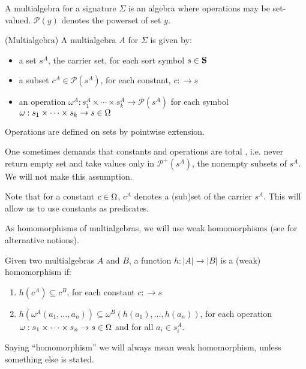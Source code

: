 \documentclass[10pt]{article}
\begin{document}
A multialgebra for a signature $\Sigma$ is an algebra where operations may be
set-valued. ${\mathcal{P}}(y)$ denotes the powerset of set $y$.

\begin{definition}\label{def:ma}
(Multialgebra) A multialgebra $A$ for $\Sigma$ is given by:
\begin{itemize}
\item  a set $s^A$, the carrier set, for each sort symbol $s\in{\bf S}$
\item  a subset $ c^A \in {\mathcal{P}}(s^A)$, for each constant, $c:\to s$
\item an operation $\omega^A : s_1^A \times \cdots \times s_k^A \to {\mathcal{P}}(s^A)$
	for each symbol $\omega : s_1\times\cdots\times s_k \to s \in \Omega$
\end{itemize}
Operations are defined on sets by pointwise extension.
\end{definition}
One sometimes demands that constants and operations are total
\cite{calc,toplas}, i.e. never return empty set and take values only in
${\mathcal{P}}^+(s^A)$, the nonempty subsets of $s^A$. We will not make this
assumption.%

Note that for a constant $c \in \Omega$, $c^A$ denotes a (sub)set of the
carrier $s^A$. This will allow us to use constants  as predicates. 

As homomorphisms of multialgebras, we will use weak homomorphisms (see
\cite{catrel} for alternative notions).
\begin{definition}Given two multialgebras $A$ and $B$, 
a function $h: |A| \to |B|$ is a (weak) homomorphism if:
\begin{enumerate}
\item $h(c^A) \subseteq c^B$, for each constant $c: \to s$ 
\item $h(\omega^A(a_1, \ldots ,a_n)) \subseteq\omega^B(h(a_1), \ldots ,h(a_n))$,
for each operation  $\omega:s_1\times\cdots\times s_n\to s\in\Omega$ and for all $a_i \in s_{i}^A$.
\end{enumerate}
\end{definition}
Saying ``homomorphism'' we will always mean weak homomorphism, unless
something else is stated.
\end{document}
